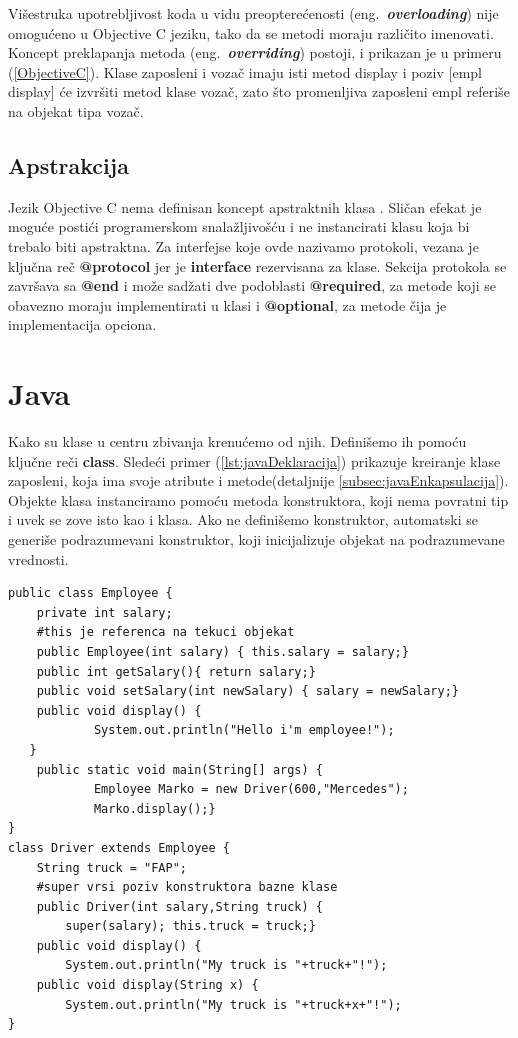 \documentclass[a4paper]{article}
\begin{document}
{Višestruka upotrebljivost koda u vidu preopterećenosti (eng.~\textbf{\em overloading}) nije omogućeno u Objective C jeziku, tako da se metodi moraju različito imenovati\cite{ObjectiveCbook}. Koncept preklapanja metoda (eng.~\textbf{\em overriding})  postoji, i prikazan je u primeru (\ref{ObjectiveC}). Klase zaposleni i vozač imaju isti metod display i poziv [empl display] će izvršiti metod klase vozač, zato što promenljiva zaposleni empl referiše na objekat tipa vozač.

\subsection{Apstrakcija}
\label{subsec:ObjCApstrakcija}

Jezik Objective C nema definisan koncept apstraktnih klasa \cite{ObjectiveCbook}. Sličan efekat je moguće postići programerskom snalažljivošću i ne instancirati klasu koja bi trebalo biti apstraktna. Za interfejse koje ovde nazivamo protokoli, vezana je ključna reč \textbf{@protocol} jer je \textbf{interface} rezervisana za klase. Sekcija protokola se završava sa \textbf{@end} i može sadžati dve podoblasti \textbf{@required}, za metode koji se obavezno moraju implementirati u klasi i \textbf{@optional}, za metode čija je implementacija opciona.

\section{Java}
\label{sec:java}

Kako su klase u centru zbivanja krenućemo od njih. Definišemo ih pomoću ključne reči \textbf{class}. Sledeći primer (\ref{lst:javaDeklaracija}) prikazuje kreiranje klase zaposleni, koja ima svoje atribute i metode(detaljnije \ref{subsec:javaEnkapsulacija}). Objekte klasa instanciramo pomoću metoda konstruktora, koji nema povratni tip i uvek se zove isto kao i klasa. Ako ne definišemo konstruktor, automatski se generiše podrazumevani konstruktor\cite{horstmann2017core}, koji inicijalizuje objekat na podrazumevane vrednosti.

\begin{lstlisting}[caption={Primer deklarisanja klase sa enkapsulacijom i nasleđivanjem},frame=single, label=lst:javaDeklaracija]
public class Employee {
	private int salary;
	#this je referenca na tekuci objekat
	public Employee(int salary) { this.salary = salary;}
 	public int getSalary(){ return salary;}
	public void setSalary(int newSalary) { salary = newSalary;}
	public void display() {
     		System.out.println("Hello i'm employee!");
   }
	public static void main(String[] args) {
    		Employee Marko = new Driver(600,"Mercedes");
    		Marko.display();}    
}
class Driver extends Employee {
  	String truck = "FAP";
	#super vrsi poziv konstruktora bazne klase
   	public Driver(int salary,String truck) {
		super(salary); this.truck = truck;}
  	public void display() {
		System.out.println("My truck is "+truck+"!");
	public void display(String x) {
		System.out.println("My truck is "+truck+x+"!");
}
\end{lstlisting}
}
\end{document}
